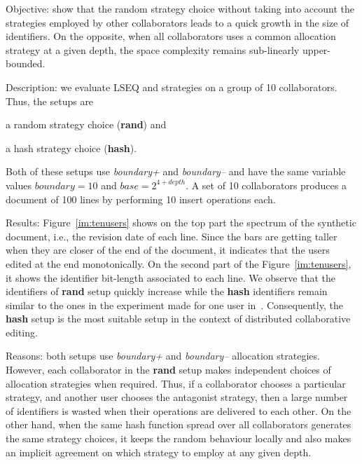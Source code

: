 \begin{asparadesc}
\item[Objective:] show that the random strategy choice without taking into
  account the strategies employed by other collaborators leads to a quick
  growth in the size of identifiers. On the opposite, when all collaborators
  uses a common allocation strategy at a given depth, the space complexity
  remains sub-linearly upper-bounded.

\item[Description:] we evaluate LSEQ and \NAME{} strategies on a group of 10
  collaborators. Thus, the setups are
  \begin{inparaenum}[(i)]
  \item a random strategy choice (\textbf{rand}) and
  \item a hash strategy choice (\textbf{hash}).
  \end{inparaenum}
  Both of these setups use \emph{boundary+} and \emph{boundary--} and have
  the same variable values $boundary=10$ and $base=2^{4+depth}$. A set of 10
  collaborators produces a document of 100 lines by performing 10 insert
  operations each.

\item[Results:] Figure~\ref{im:tenusers} shows on the top part the spectrum of
  the synthetic document, i.e., the revision date of each line. Since the bars
  are getting taller when they are closer of the end of the document, it
  indicates that the users edited at the end monotonically. On the second part
  of the Figure~\ref{im:tenusers}, it shows the identifier bit-length
  associated to each line. We observe that the identifiers of \textbf{rand}
  setup quickly increase while the \textbf{hash} identifiers remain similar to
  the ones in the experiment made for one user
  in~\cite{nedelec2013lseq}. Consequently, the \textbf{hash} setup is the most
  suitable setup in the context of distributed collaborative editing.

\item[Reasons:] both setups use \emph{boundary+} and \emph{boundary--}
  allocation strategies. However, each collaborator in the \textbf{rand} setup
  makes independent choices of allocation strategies when required. Thus, if a
  collaborator chooses a particular strategy, and another user chooses the
  antagonist strategy, then a large number of identifiers is wasted when their
  operations are delivered to each other. On the other hand, when the same hash
  function spread over all collaborators generates the same strategy choices,
  it keeps the random behaviour locally and also makes an implicit agreement on
  which strategy to employ at any given depth.
\end{asparadesc}

